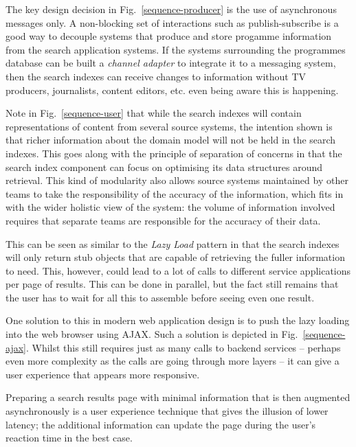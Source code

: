 \documentclass{llncs}
\begin{document}
The key design decision in Fig.~\ref{sequence-producer} is the use of
asynchronous messages only. A non-blocking set of interactions such as
publish-subscribe\cite{hohpe2004enterprise} is a good way to decouple
systems that produce and store progamme information from the search
application systems. If the systems surrounding the programmes database
can be built a \emph{channel adapter}\cite{hohpe2004enterprise} to integrate
it to a messaging system, then the search indexes can receive changes to
information without TV producers, journalists, content
editors, etc. even being aware this is happening.

Note in Fig.~\ref{sequence-user} that while the search indexes
will contain representations of content
from several source systems, the intention shown is that richer information
about the domain model will not be held in the search indexes. This goes
along with the principle of separation of concerns\cite{dijkstra1982role}
in that the search index component can focus on optimising its data
structures around retrieval. This kind of modularity also allows source
systems maintained by other teams to take the responsibility of the
accuracy of the information, which fits in with the wider holistic view
of the system: the volume of information involved requires that
separate teams are responsible for the accuracy of their data.

This can be seen as similar to the \emph{Lazy Load} pattern
\cite{fowler2002patterns} in that the search indexes will only return
stub objects that are capable of retrieving the fuller information
to need. This, however, could lead to a lot of calls to different
service applications per page of results. This can be done in parallel, but
the fact still remains that the user has to wait for all this to
assemble before seeing even one result.

One solution to this in modern web application design is to
push the lazy loading into the web browser using AJAX.\cite{garrett2005ajax}
Such a solution is depicted in Fig.~\ref{sequence-ajax}. Whilst
this still requires just as many calls to backend services --
perhaps even more complexity as the calls are going through
more layers -- it can give a user experience that appears more responsive.

Preparing a search results page with minimal information that is then
augmented asynchronously is a user experience technique that gives the
illusion of lower latency; the additional information can update the page
during the user's reaction time in the best case.
\end{document}
